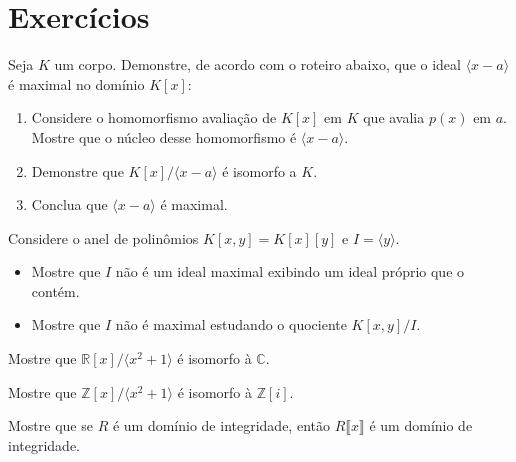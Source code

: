 \section{Exercícios}
\begin{exer}
    Seja $K$ um corpo. Demonstre, de acordo com o roteiro abaixo, que o ideal $\langle x-a\rangle$ é maximal no domínio $K[x]$:
    \begin{enumerate}[label=\alph*)]
        \item Considere o homomorfismo avaliação de $K[x]$ em $K$ que avalia $p(x)$ em $a$. Mostre que o núcleo desse homomorfismo é $\langle x-a\rangle$.
        \item Demonstre que $K[x]/\langle x-a\rangle$ é isomorfo a $K$.
        \item Conclua que $\langle x-a\rangle$ é maximal.
    \end{enumerate}
\end{exer}
\begin{exer}
    Considere o anel de polinômios $K[x, y]=K[x][y]$ e  $I=\langle y\rangle$.
    \begin{itemize}
        \item Mostre que $I$ não é um ideal maximal exibindo um ideal próprio que o contém.
        \item Mostre que $I$ não é maximal estudando o quociente $K[x, y]/I$.
    \end{itemize}
\end{exer}
\begin{exer}
Mostre que $\mathbb R[x]/\langle x^2+1\rangle$ é isomorfo à $\mathbb C$.
\end{exer}
\begin{exer}
    Mostre que $\mathbb Z[x]/\langle x^2+1\rangle$ é isomorfo à $\mathbb Z[i]$.
\end{exer}
\begin{exer}\label{exer:polinomio_serieDominio}
    Mostre que se $R$ é um domínio de integridade, então $R\llbracket x \rrbracket$ é um domínio de integridade.
\end{exer}
